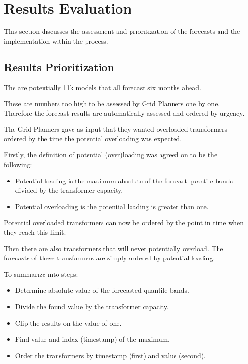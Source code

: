 \documentclass[letterpaper,10pt,english]{sphinxmanual}
\begin{document}
\section{Results Evaluation}
\label{\detokenize{evaluation:results-evaluation}}
This section discusses the assessment and prioritization of the forecasts and the implementation within the process.


\subsection{Results Prioritization}
\label{\detokenize{evaluation:results-prioritization}}
The are potentially 11k models that all forecast six months ahead.

These are numbers too high to be assessed by Grid Planners one by one.
Therefore the forecast results are automatically assessed and ordered by urgency.

The Grid Planners gave as input that they wanted overloaded transformers ordered by the time the potential overloading was expected.

Firstly, the definition of potential (over)loading was agreed on to be the following:
\begin{itemize}
\item {} 
Potential loading is the maximum absolute of the forecast quantile bands divided by the transformer capacity.

\item {} 
Potential overloading is the potential loading is greater than one.

\end{itemize}

Potential overloaded transformers can now be ordered by the point in time when they reach this limit.

Then there are also transformers that will never potentially overload.
The forecasts of these transformers are simply ordered by potential loading.

To summarize into steps:
\begin{itemize}
\item {} 
Determine absolute value of the forecasted quantile bands.

\item {} 
Divide the found value by the transformer capacity.

\item {} 
Clip the results on the value of one.

\item {} 
Find value and index (timestamp) of the maximum.

\item {} 
Order the transformers by timestamp (first) and value (second).

\end{itemize}
\end{document}
